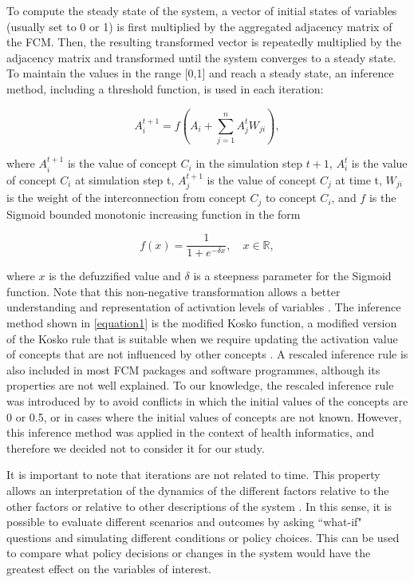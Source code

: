 To compute the steady state of the system, a vector of initial states of variables (usually set to 0 or 1) is first multiplied by the aggregated adjacency matrix of the FCM. Then, the resulting transformed vector is repeatedly multiplied by the adjacency matrix and transformed until the system converges to a steady state. To maintain the values in the range [0,1] and reach a steady state, an inference method, including a threshold function, is used in each iteration:

\begin{equation}
\label{equation1} 
A_i^{t+1} = f \left( A_i + \sum_{j=1}^{n} A_j^t W_{ji} \right), 
\end{equation}

where $A_i^{t+1}$ is the value of concept $C_i$ in the simulation step $t+1$, $A_i^{t}$ is the value of concept $C_i$ at simulation step t, $A_j^{t+1}$ is the value of concept $C_j$ at time t, $W_{ji}$ is the weight of the interconnection from concept $C_j$ to concept $C_i$, and $f$ is the Sigmoid bounded monotonic increasing function in the form

\begin{equation}
\label{equation2}  
f(x) = \frac{1}{1+e^{-\delta x}}, \quad  x \in \mathbb{R}, 
\end{equation}

where $x$ is the defuzzified value and $\delta$ is a steepness parameter for the Sigmoid function. Note that this non-negative transformation allows a better understanding and representation of activation levels of variables \citep{ozesmi2004ecological}. The inference method shown in \cref{equation1} is the modified Kosko function, a modified version of the Kosko rule that is suitable when we require updating the activation value of concepts that are not influenced by other concepts \citep{sujamol2018study}. A rescaled inference rule is also included in most FCM packages and software programmes, although its properties are not well explained. To our knowledge, the rescaled inference rule was introduced by \cite{papageorgiou2011new} to avoid conflicts in which the initial values of the concepts are 0 or 0.5, or in cases where the initial values of concepts are not known. However, this inference method was applied in the context of health informatics, and therefore we decided not to consider it for our study. 

It is important to note that iterations are not related to time. This property allows an interpretation of the dynamics of the different factors relative to the other factors or relative to other descriptions of the system \citep{edwards2021building, diniz2015mapping}. In this sense, it is possible to evaluate different scenarios and outcomes by asking ``what-if" questions and simulating different conditions or policy choices. This can be used to compare what policy decisions or changes in the system would have the greatest effect on the variables of interest.




